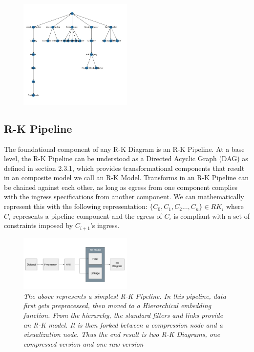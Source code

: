 \begin{figure}[H]
	\centering
        \includegraphics[width=0.5\textwidth]{images/ss_dendrogram.png}
	\caption{\textit{}}
	\label{fig:nodemask}
\end{figure}


\subsection{R-K Pipeline}

The foundational component of any R-K Diagram is an R-K Pipeline. At a base level, the R-K Pipeline can be understood as a Directed Acyclic Graph (DAG) as defined in section 2.3.1, which provides transformational components that result in an composite model we call an R-K Model. Transforms in an R-K Pipeline can be chained against each other, as long as egress from one component complies with the ingress specifications from another component. We can mathematically represent this with the following representation: $\lbrace C_{0}, C_{1}, C_{2}..., C_{n} \rbrace \in RK_{i} $ where $C_{i}$ represents a pipeline component and the egress of $C_{i}$ is compliant with a set of constraints imposed by $C_{i+1}$'s ingress.
\begin{figure}[H]
	\centering
        \includegraphics[width=0.5\textwidth]{images/simpliest_pipeline.png}
	\caption{\textit{The above represents a simplest R-K Pipeline. In this pipeline, data first gets preprocessed, then moved to a Hierarchical embedding function. From the hierarchy, the standard filters and links provide an R-K model. It is then forked between a compression node and a visualization node. Thus the end result is two R-K Diagrams, one compressed version and one raw version}}
	\label{fig:example_pipeline_fig}
\end{figure}

